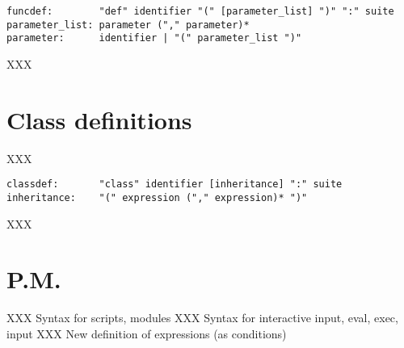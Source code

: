 \begin{verbatim}
funcdef:        "def" identifier "(" [parameter_list] ")" ":" suite
parameter_list: parameter ("," parameter)*
parameter:      identifier | "(" parameter_list ")"
\end{verbatim}

XXX

\section{Class definitions} \label{class}

XXX

\begin{verbatim}
classdef:       "class" identifier [inheritance] ":" suite
inheritance:    "(" expression ("," expression)* ")"
\end{verbatim}

XXX

\section{P.M.}

XXX Syntax for scripts, modules
XXX Syntax for interactive input, eval, exec, input
XXX New definition of expressions (as conditions)


